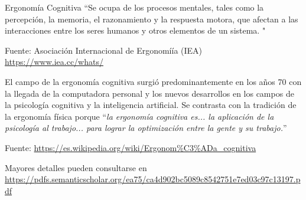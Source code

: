 \begin{frame}{}
  \begin{block}{Ergonom\'ia Cognitiva}
    ``Se ocupa de los procesos mentales, tales como la percepci\'on, la memoria, el razonamiento y la respuesta motora, que afectan a las interacciones entre los seres humanos y otros elementos de un sistema. %
"

{\tiny Fuente: Asociaci\'on Internacional de Ergonom\'iía (IEA) \,
\url{https://www.iea.cc/whats/}}

  \end{block}

\vspace{3mm}

El campo de la ergonom\'ia cognitiva surgi\'o predominantemente en los a\~nos 70 con la llegada de la computadora personal y los nuevos desarrollos en los campos de la psicolog\'ia cognitiva y la inteligencia artificial. Se contrasta con la tradici\'on de la ergonom\'ia f\'isica porque ``\emph{la ergonom\'ia cognitiva es... la aplicaci\'on de la psicolog\'ia al trabajo... para lograr la optimizaci\'on entre la gente y su trabajo.}''

{\tiny Fuente: \url{https://es.wikipedia.org/wiki/Ergonom\%C3\%ADa_cognitiva}}

\vspace{3mm}

Mayores detalles pueden consultarse en \cite{van_der_Veer} \\
{\tiny \url{https://pdfs.semanticscholar.org/ea75/ca4d902bc5089c8542751e7ed03c97c13197.pdf}
}


\end{frame}

